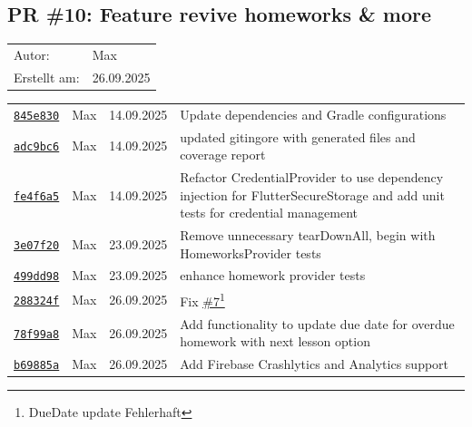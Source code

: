 \documentclass{article}%
\begin{document}
\subsection{PR \#10: Feature revive homeworks \& more}%
\label{pr:10}%
\begin{tabular}{l l}%
Autor:&Max\\%
Erstellt am: &26.09.2025\\%
\end{tabular}%
\begin{longtable}{l l l p{12cm}}%
\href{https://github.com/scriptor1000/homeworks/pull/10/commits/845e830f9111dc0500d96ee0bfa983f7219d7211}{\underline{\texttt{845e830}}}&Max&14.09.2025&Update dependencies and Gradle configurations\\%
\href{https://github.com/scriptor1000/homeworks/pull/10/commits/adc9bc69378280eeb1b1404139a5b94fb02b64fd}{\underline{\texttt{adc9bc6}}}&Max&14.09.2025&updated gitingore with generated files and coverage report\\%
\href{https://github.com/scriptor1000/homeworks/pull/10/commits/fe4f6a592766868f5dfed5e5f1de849562c3f0e7}{\underline{\texttt{fe4f6a5}}}&Max&14.09.2025&Refactor CredentialProvider to use dependency injection for FlutterSecureStorage and add unit tests for credential management\\%
\href{https://github.com/scriptor1000/homeworks/pull/10/commits/3e07f20b0163c71325957cf586e110c892e4f9b8}{\underline{\texttt{3e07f20}}}&Max&23.09.2025&Remove unnecessary tearDownAll, begin with HomeworksProvider tests\\%
\href{https://github.com/scriptor1000/homeworks/pull/10/commits/499dd98c93cbe8e966302c3fcfdbe182dd714bda}{\underline{\texttt{499dd98}}}&Max&23.09.2025&enhance homework provider tests\\%
\href{https://github.com/scriptor1000/homeworks/pull/10/commits/288324f078ff8c3c4be66c4b1195bb6061b53e06}{\underline{\texttt{288324f}}}&Max&26.09.2025&Fix \href{https://github.com/scriptor1000/homeworks/issues/7}{\underline{\#7}}\footnote{DueDate update Fehlerhaft}\\%
\href{https://github.com/scriptor1000/homeworks/pull/10/commits/78f99a89d32aac9092fc42cef7fbe58beef83642}{\underline{\texttt{78f99a8}}}&Max&26.09.2025&Add functionality to update due date for overdue homework with next lesson option\\%
\href{https://github.com/scriptor1000/homeworks/pull/10/commits/b69885ad65ed47813ad1547272960f3304699887}{\underline{\texttt{b69885a}}}&Max&26.09.2025&Add Firebase Crashlytics and Analytics support\\%

\end{longtable}
\end{document}
